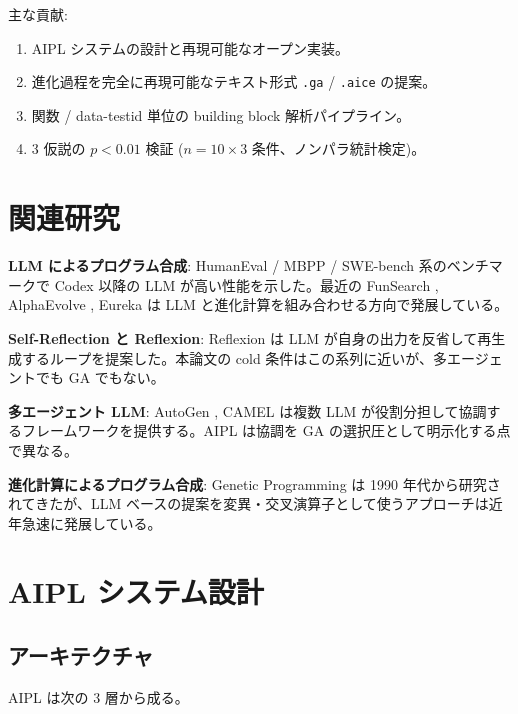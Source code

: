 \documentclass[a4paper,11pt]{ltjsarticle}
\begin{document}
主な貢献:
\begin{enumerate}[leftmargin=2em,itemsep=2pt]
  \item AIPL システムの設計と再現可能なオープン実装。
  \item 進化過程を完全に再現可能なテキスト形式 \texttt{.ga} / \texttt{.aice} の提案。
  \item 関数 / data-testid 単位の building block 解析パイプライン。
  \item 3 仮説の $p < 0.01$ 検証 ($n = 10 \times 3$ 条件、ノンパラ統計検定)。
\end{enumerate}

\section{関連研究}

\textbf{LLM によるプログラム合成}: HumanEval \cite{humaneval} / MBPP / SWE-bench 系のベンチマークで Codex 以降の LLM が高い性能を示した。最近の FunSearch \cite{funsearch}, AlphaEvolve \cite{alphaevolve}, Eureka \cite{eureka} は LLM と進化計算を組み合わせる方向で発展している。

\textbf{Self-Reflection と Reflexion}: Reflexion \cite{reflexion} は LLM が自身の出力を反省して再生成するループを提案した。本論文の cold 条件はこの系列に近いが、多エージェントでも GA でもない。

\textbf{多エージェント LLM}: AutoGen \cite{autogen}, CAMEL \cite{camel} は複数 LLM が役割分担して協調するフレームワークを提供する。AIPL は協調を GA の選択圧として明示化する点で異なる。

\textbf{進化計算によるプログラム合成}: Genetic Programming は 1990 年代から研究されてきたが、LLM ベースの提案を変異・交叉演算子として使うアプローチは近年急速に発展している。

\section{AIPL システム設計}

\subsection{アーキテクチャ}

AIPL は次の 3 層から成る。
\end{document}
